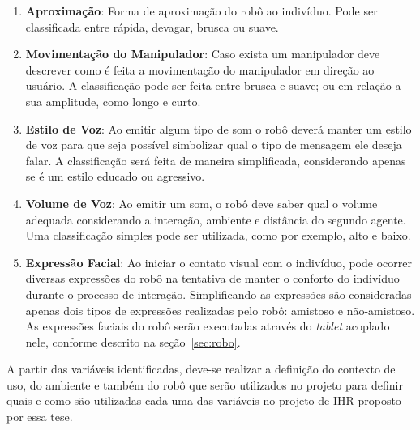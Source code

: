 \begin{enumerate}
	\item \textbf{Aproximação}: Forma de aproximação do robô ao indivíduo. Pode ser classificada entre rápida, devagar, brusca ou suave.
	\item \textbf{Movimentação do Manipulador}: Caso exista um manipulador deve descrever como é feita a movimentação do manipulador em direção ao usuário. A classificação pode ser feita entre brusca e suave; ou em relação a sua amplitude, como longo e curto.
	\item \textbf{Estilo de Voz}: Ao emitir algum tipo de som o robô deverá manter um estilo de voz para que seja possível simbolizar qual o tipo de mensagem ele deseja falar. A classificação será feita de maneira simplificada, considerando apenas se é um estilo educado ou agressivo.
	\item \textbf{Volume de Voz}: Ao emitir um som, o robô deve saber qual o volume adequada considerando a interação, ambiente e distância do segundo agente. Uma classificação simples pode ser utilizada, como por exemplo, alto e baixo.
	\item \textbf{Expressão Facial}: Ao iniciar o contato visual com o indivíduo, pode ocorrer diversas expressões do robô na tentativa de manter o conforto do indivíduo durante o processo de interação. Simplificando as expressões são consideradas apenas dois tipos de expressões realizadas pelo robô: amistoso e não-amistoso. As expressões faciais do robô serão executadas através do \emph{tablet} acoplado nele, conforme descrito na seção~\ref{sec:robo}.
\end{enumerate}

A partir das variáveis identificadas, deve-se realizar a definição do contexto de uso, do ambiente e também do robô que serão utilizados no projeto para definir quais e como são utilizadas cada uma das variáveis no projeto de IHR proposto por essa tese.

